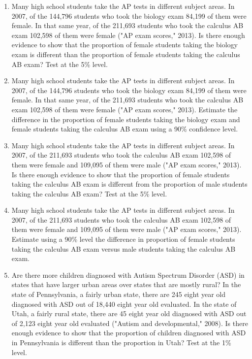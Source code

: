 \documentclass[]{book}
\begin{document}
\begin{enumerate}
\def\labelenumi{\arabic{enumi}.}
\item
  Many high school students take the AP tests in different subject areas. In 2007, of the 144,796 students who took the biology exam 84,199 of them were female. In that same year, of the 211,693 students who took the calculus AB exam 102,598 of them were female ("AP exam scores," 2013). Is there enough evidence to show that the proportion of female students taking the biology exam is different than the proportion of female students taking the calculus AB exam? Test at the 5\% level.
\item
  Many high school students take the AP tests in different subject areas. In 2007, of the 144,796 students who took the biology exam 84,199 of them were female. In that same year, of the 211,693 students who took the calculus AB exam 102,598 of them were female ("AP exam scores," 2013). Estimate the difference in the proportion of female students taking the biology exam and female students taking the calculus AB exam using a 90\% confidence level.
\item
  Many high school students take the AP tests in different subject areas. In 2007, of the 211,693 students who took the calculus AB exam 102,598 of them were female and 109,095 of them were male ("AP exam scores," 2013). Is there enough evidence to show that the proportion of female students taking the calculus AB exam is different from the proportion of male students taking the calculus AB exam? Test at the 5\% level.
\item
  Many high school students take the AP tests in different subject areas. In 2007, of the 211,693 students who took the calculus AB exam 102,598 of them were female and 109,095 of them were male ("AP exam scores," 2013). Estimate using a 90\% level the difference in proportion of female students taking the calculus AB exam versus male students taking the calculus AB exam.
\item
  Are there more children diagnosed with Autism Spectrum Disorder (ASD) in states that have larger urban areas over states that are mostly rural? In the state of Pennsylvania, a fairly urban state, there are 245 eight year old diagnosed with ASD out of 18,440 eight year old evaluated. In the state of Utah, a fairly rural state, there are 45 eight year old diagnosed with ASD out of 2,123 eight year old evaluated ("Autism and developmental," 2008). Is there enough evidence to show that the proportion of children diagnosed with ASD in Pennsylvania is different than the proportion in Utah? Test at the 1\% level.

\end{enumerate}
\end{document}
